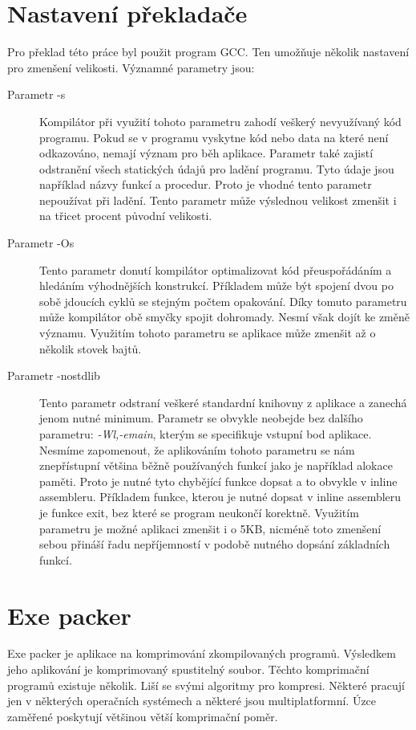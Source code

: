 \section{Nastavení překladače}
Pro překlad této práce byl použit program GCC.
Ten umožňuje několik nastavení pro zmenšení velikosti.
Významné parametry jsou:
\begin{description}
\item[Parametr -s]
Kompilátor při využití tohoto parametru zahodí veškerý nevyužívaný kód programu.
Pokud se v programu vyskytne kód nebo data na které není odkazováno, nemají význam pro běh aplikace.
Parametr také zajistí odstranění všech statických údajů pro ladění programu.
Tyto údaje jsou například názvy funkcí a procedur.
Proto je vhodné tento parametr nepoužívat při ladění.
Tento parametr může výslednou velikost zmenšit i na třicet procent původní velikosti.

\item[Parametr -Os]
Tento parametr donutí kompilátor optimalizovat kód přeuspořádáním a hledáním výhodnějších konstrukcí.
Příkladem může být spojení dvou po sobě jdoucích cyklů se stejným počtem opakování.
Díky tomuto parametru může kompilátor obě smyčky spojit dohromady.
Nesmí však dojít ke změně významu.
Využitím tohoto parametru se aplikace může zmenšit až o několik stovek bajtů.

\item[Parametr -nostdlib]
Tento parametr odstraní veškeré standardní knihovny z aplikace a zanechá jenom nutné minimum.
Parametr se obvykle neobejde bez dalšího parametru: {\it-Wl,-emain}, kterým se specifikuje vstupní bod aplikace.
Nesmíme zapomenout, že aplikováním tohoto parametru se nám znepřístupní většina běžně používaných funkcí jako je například alokace paměti.
Proto je nutné tyto chybějící funkce dopsat a to obvykle v inline assembleru.
Příkladem funkce, kterou je nutné dopsat v inline assembleru je funkce exit, bez které se program neukončí korektně.
Využitím parametru je možné aplikaci zmenšit i o 5KB, nicméně toto zmenšení sebou přináší řadu ne\-pří\-jem\-nos\-tí v podobě nutného dopsání základních funkcí.
\end{description}

\section{Exe packer}
Exe packer je aplikace na komprimování zkompilovaných programů.
Výsledkem jeho aplikování je komprimovaný spustitelný soubor.
Těchto komprimační programů existuje ně\-ko\-lik.
Liší se svými algoritmy pro kompresi.
Některé pracují jen v některých operačních systémech a některé jsou multiplatformní.
Úzce zaměřené poskytují většinou větší komprimační poměr.

